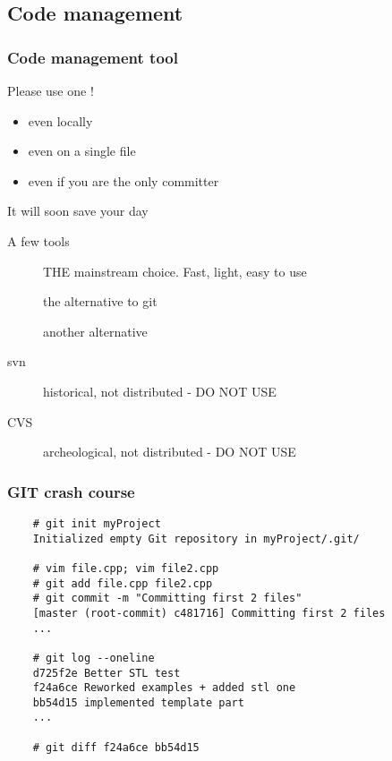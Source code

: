 \subsection[VCS]{Code management}

\begin{frame}[fragile]
  \frametitle{Code management tool}
  \begin{alertblock}{Please use one !}
    \begin{itemize}
    \item even locally
    \item even on a single file
    \item even if you are the only committer
    \end{itemize}
    It will soon save your day
  \end{alertblock}
  \begin{block}{A few tools}
    \begin{description}
    \item[\href{http://git-scm.com/}{}]
      THE mainstream choice. Fast, light, easy to use
    \item[\href{http://mercurial.selenic.com/}{}]
      the alternative to git
    \item[\href{http://bazaar.canonical.com/en/}{}]
      another alternative
    \item[svn]
      historical, not distributed - DO NOT USE
    \item[CVS]
      archeological, not distributed - DO NOT USE
    \end{description}
  \end{block}
\end{frame}

\begin{frame}[fragile]
  \frametitle{GIT crash course}
  \begin{verbatim}
    # git init myProject
    Initialized empty Git repository in myProject/.git/

    # vim file.cpp; vim file2.cpp
    # git add file.cpp file2.cpp
    # git commit -m "Committing first 2 files"
    [master (root-commit) c481716] Committing first 2 files
    ...

    # git log --oneline
    d725f2e Better STL test
    f24a6ce Reworked examples + added stl one
    bb54d15 implemented template part
    ...

    # git diff f24a6ce bb54d15
  \end{verbatim}
\end{frame}

